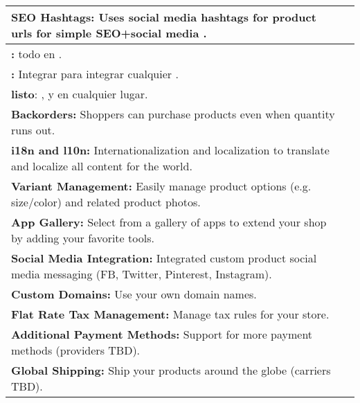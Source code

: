 \begin{table}[h!]
\begin{tabular}{ |L{0.6\paperwidth}|L{0.1\paperwidth}|}
\\ \hline
	\textbf{ SEO Hashtags:} Uses social media hashtags for product urls for simple SEO+social media \tracking.&
	
\\ \hline
	\textbf{ \onepage \checkout:} \checkout todo en \onepage.&
	
\\ \hline
	\textbf{ \shop \analytics:} Integrar \tracking \framework para integrar cualquier \analytics \system.&
	
\\ \hline
	\textbf{ \dockerio listo}: \build, \ship y \run en cualquier lugar.&
	
\\ \hline
	 \textbf{ Backorders:} Shoppers can purchase products even when quantity runs out.&
	
\\ \hline
	\textbf{ i18n and l10n:} Internationalization and localization to translate and localize all content for the world.&
	
\\ \hline
	\textbf{ Variant Management:} Easily manage product options (e.g. size/color) and related product photos.&
	
\\ \hline
	\textbf{ App Gallery:} Select from a gallery of apps to extend your shop by adding your favorite tools.&
	
\\ \hline
	\textbf{ Social Media Integration:} Integrated custom product social media messaging (FB, Twitter, Pinterest, Instagram).&
	
\\ \hline
	\textbf{ Custom Domains:} Use your own domain names.&
	
\\ \hline
	\textbf{ Flat Rate Tax Management:} Manage tax rules for your store.&
	
\\ \hline
	\textbf{ Additional Payment Methods:} Support for more payment methods (providers TBD).&
	
\\ \hline
	\textbf{ Global Shipping:} Ship your products around the globe (carriers TBD).&
	

\end{tabular}
\end{table}
